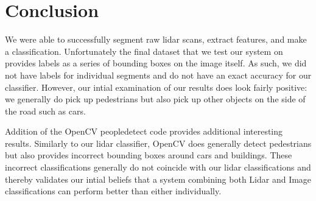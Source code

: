 \documentclass[10pt,twocolumn,letterpaper]{article}
\begin{document}
\section{Conclusion}
  We were able to successfully segment raw lidar scans, extract
  features, and make a classification. Unfortunately the final dataset that
  we test our system on provides labels as a series of bounding boxes on the
  image itself. As such, we did not have labels for individual segments and do
  not have an exact accuracy for our classifier. However, our intial examination
  of our results does look fairly positive: we generally do pick up pedestrians
  but also pick up other objects on the side of the road such as cars.

  Addition of the OpenCV peopledetect code provides additional interesting
  results. Similarly to our lidar classifier, OpenCV does generally detect
  pedestrians but also provides incorrect bounding boxes around cars and buildings.
  These incorrect classifications generally do not coincide with our lidar
  classifications and thereby validates our intial beliefs that a system combining
  both Lidar and Image classifications can perform better than either individually.


{\small


}
\end{document}
